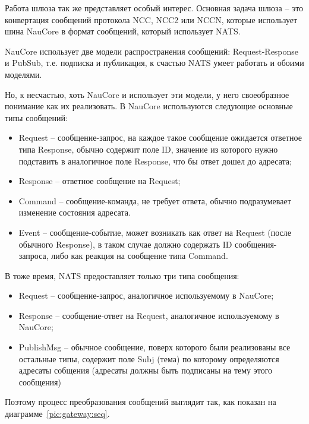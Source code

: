 Работа шлюза так же представляет особый интерес.
Основная задача шлюза -- это конвертация сообщений протокола NCC, NCC2 или NCCN,
которые использует шина NauCore в формат сообщений, который использует NATS\@.

NauCore использует две модели распространения сообщений: Request-Response и PubSub,
т.е. подписка и публикация, к счастью NATS умеет работать и обоими моделями.

Но, к несчастью, хоть NauCore и использует эти модели, у него своеобразное понимание как их реализовать.
В NauCore используются следующие основные типы сообщений:
\begin{itemize}
    \item Request -- сообщение-запрос, на каждое такое сообщение ожидается ответное типа Response,
    обычно содержит поле ID, значение из которого нужно подставить в аналогичное поле Response, что бы ответ дошел до адресата;
    \item Response -- ответное сообщение на Request;
    \item Command -- сообщение-команда, не требует ответа, обычно подразумевает изменение состояния адресата.
    \item Event -- сообщение-событие, может возникать как ответ на Request (после обычного Response),
    в таком случае должно содержать ID сообщения-запроса, либо как реакция на сообщение типа Command.
\end{itemize}

В тоже время, NATS предоставляет только три типа сообщения:
\begin{itemize}
    \item Request -- сообщение-запрос, аналогичное используемому в NauCore;
    \item Response -- сообщение-ответ на Request, аналогичное используемому в NauCore;
    \item PublishMsg -- обычное сообщение, поверх которого были реализованы все остальные типы,
    содержит поле Subj (тема) по которому определяются адресаты собщения (адресаты должны быть подписаны на тему этого сообщения)
\end{itemize}

Поэтому процесс преобразования сообщений выглядит так, как показан на диаграмме~\ref{pic:gateway:seq}.



